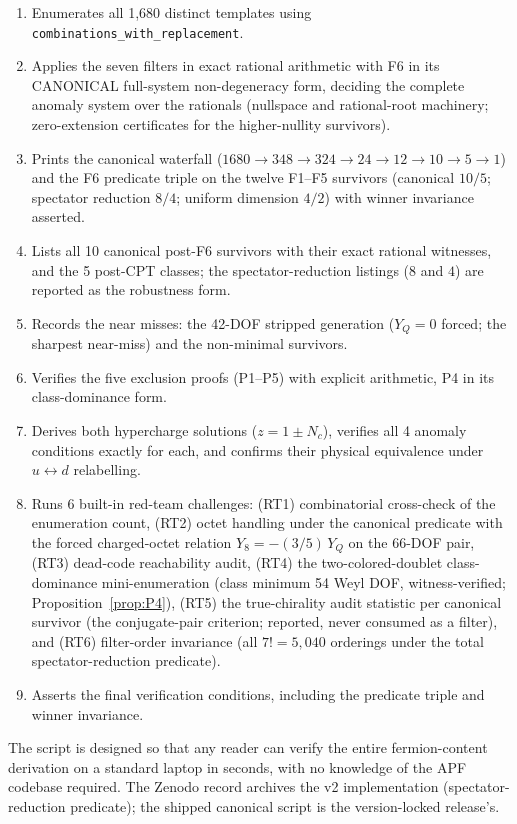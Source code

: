 \documentclass[11pt]{article}
\theoremstyle{definition}
\begin{document}
\begin{enumerate}[nosep,label=(\arabic*)]
  \item Enumerates all 1{,}680 distinct templates using
  \texttt{combinations\_with\_replacement}.
  \item Applies the seven filters in exact rational arithmetic with
  F6 in its CANONICAL full-system non-degeneracy form, deciding the
  complete anomaly system over the rationals (nullspace and
  rational-root machinery; zero-extension certificates for the
  higher-nullity survivors).
  \item Prints the canonical waterfall
  ($1680 \to 348 \to 324 \to 24 \to 12 \to 10 \to 5 \to 1$) and
  the F6 predicate triple on the twelve F1--F5 survivors (canonical
  $10/5$; spectator reduction $8/4$; uniform dimension $4/2$) with
  winner invariance asserted.
  \item Lists all 10 canonical post-F6 survivors with their exact
  rational witnesses, and the 5 post-CPT classes; the
  spectator-reduction listings ($8$ and $4$) are reported as the
  robustness form.
  \item Records the near misses: the 42-DOF stripped generation
  ($Y_Q = 0$ forced; the sharpest near-miss) and the non-minimal
  survivors.
  \item Verifies the five exclusion proofs (P1--P5) with explicit
  arithmetic, P4 in its class-dominance form.
  \item Derives both hypercharge solutions ($z = 1 \pm N_c$),
  verifies all 4 anomaly conditions exactly for each, and confirms
  their physical equivalence under $u \leftrightarrow d$ relabelling.
  \item Runs 6 built-in red-team challenges: (RT1) combinatorial
  cross-check of the enumeration count, (RT2) octet handling under
  the canonical predicate with the forced charged-octet relation
  $Y_8 = -(3/5)\,Y_Q$ on the 66-DOF pair, (RT3) dead-code
  reachability audit, (RT4) the two-colored-doublet class-dominance
  mini-enumeration (class minimum 54 Weyl DOF, witness-verified;
  Proposition~\ref{prop:P4}), (RT5) the true-chirality audit
  statistic per canonical survivor (the conjugate-pair criterion;
  reported, never consumed as a filter), and (RT6) filter-order
  invariance (all $7! = 5{,}040$ orderings under the total
  spectator-reduction predicate).
  \item Asserts the final verification conditions, including the
  predicate triple and winner invariance.
\end{enumerate}
The script is designed so that any reader can verify the entire
fermion-content derivation on a standard laptop in seconds, with no
knowledge of the APF codebase required.  The Zenodo record archives
the v2 implementation (spectator-reduction predicate); the shipped
canonical script is the version-locked release's.
\end{document}

